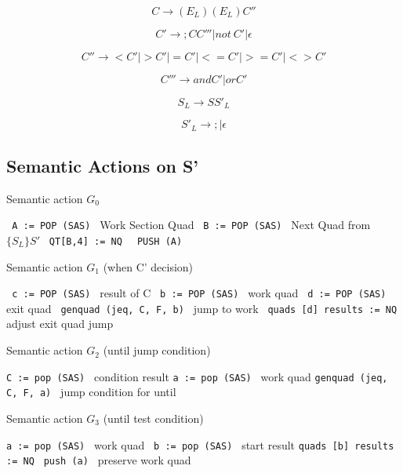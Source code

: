 \documentclass[11pt]{article}
\begin{document}
\[ C \to (E_L )(E_L) C''   \]

\[C' \to  ; C C''' | not\  C'  | \epsilon \]  

\[ C'' \to < C' | >  C' | = C' | <= C' | >= C' | <>  C' \]

\[ C''' \to and  C' | or C'  \]

\[ S_L \to S S'_L\]

\[S'_L \to ; | \epsilon\] 

\newpage
\subsection{\Large Semantic Actions on S'}

\begin {algorithm}
\caption{ Semantic action $G_0$ }
\label{alg:G0}
\begin{algorithmic}
\STATE \texttt { A := POP (SAS) }  Work Section Quad
\STATE \texttt { B := POP (SAS) }  Next Quad from $\{S_L\} S'$
\STATE \texttt { QT[B,4]  :=  NQ }  
\STATE \texttt { PUSH (A) }

\end{algorithmic}
\end{algorithm}

\begin {algorithm}
\caption{ Semantic action $G_1$ (when C' decision) }
\label{alg:G1}
\begin{algorithmic}
\STATE \texttt { c := POP (SAS) }  result of C
\STATE \texttt { b := POP (SAS) }  work quad 
\STATE \texttt { d := POP (SAS) }  exit quad
\STATE \texttt { genquad (jeq, C, F, b) }     jump to work
\STATE \texttt { quads [d] results := NQ }  adjust exit quad jump
\end{algorithmic}
\end{algorithm}

\begin{algorithm}
\caption{ Semantic action $G_2$ (until jump condition)}
\label{alg:G2}
\begin{algorithmic}
\STATE \texttt {C := pop (SAS) } condition result
\STATE \texttt {a := pop (SAS) } work quad
\STATE \texttt {genquad (jeq, C, F, a) } jump condition for until
\end{algorithmic}
\end{algorithm}


\begin{algorithm}
\caption{ Semantic action $G_3$ (until test condition)}
\label{alg:G2}
\begin{algorithmic}
\STATE \texttt {a := pop (SAS) } work quad
\STATE \texttt {  b := pop (SAS) } start  result
\STATE \texttt {quads [b] results := NQ }
\STATE \texttt {push (a) }  preserve work quad
\end{algorithmic}
\end{algorithm}
\end{document}
